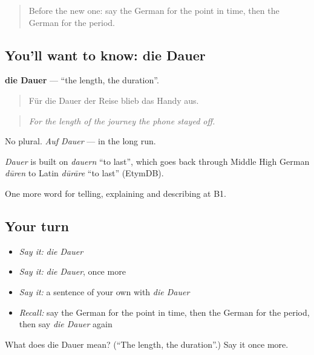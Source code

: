 \begin{quote}
Before the new one: say the German for the point in time, then the German for the period.
\end{quote}

\subsection*{You'll want to know: die Dauer}
\textbf{die Dauer} — \textquotedblleft{}the length, the duration\textquotedblright{}.

\begin{quote}
Für die Dauer der Reise blieb das Handy aus.
\end{quote}

\begin{quote}
\emph{For the length of the journey the phone stayed off.}
\end{quote}

No plural. \emph{Auf Dauer} — in the long run.

\begin{cousinweb}
\emph{Dauer} is built on \emph{dauern} \textquotedblleft{}to last\textquotedblright{}, which goes back through Middle High German \emph{dūren} to Latin \emph{dūrāre} \textquotedblleft{}to last\textquotedblright{} (EtymDB).
\end{cousinweb}

\begin{grammarlens}[title={What you've built}]
One more word for telling, explaining and describing at B1.
\end{grammarlens}

\subsection*{Your turn}
\begin{itemize}
\raggedright
  \item \emph{Say it:} \emph{die Dauer}
  \item \emph{Say it:} \emph{die Dauer}, once more
  \item \emph{Say it:} a sentence of your own with \emph{die Dauer}
  \item \emph{Recall:} say the German for the point in time, then the German for the period, then say \emph{die Dauer} again
\end{itemize}

\begin{tcolorbox}[breakable,colback=teal!4,colframe=teal!35!black,title={Before you move on}]
What does die Dauer mean? (\textquotedblleft{}The length, the duration\textquotedblright{}.) Say it once more.
\end{tcolorbox}
